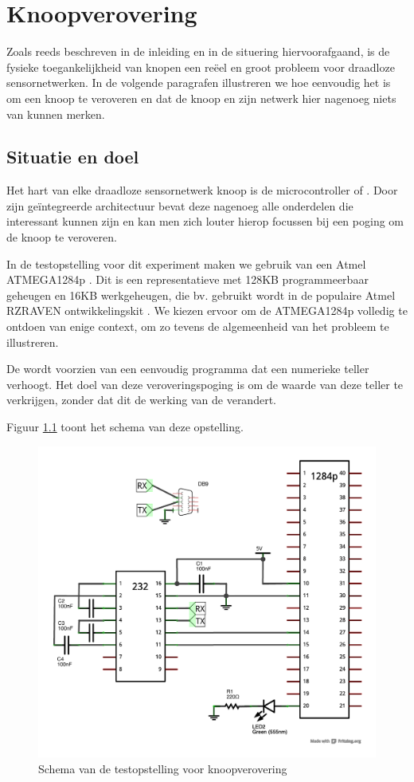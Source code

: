 
\chapter{Knoopverovering}
\label{appendix:node-capture}

Zoals reeds beschreven in de inleiding en in de situering hiervoorafgaand, is
de fysieke toegankelijkheid van knopen een re\"eel en groot probleem voor
draadloze sensornetwerken. In de volgende paragrafen illustreren we hoe
eenvoudig het is om een knoop te veroveren en dat de knoop en zijn netwerk hier
nagenoeg niets van kunnen merken.

\section{Situatie en doel}

Het hart van elke draadloze sensornetwerk knoop is de microcontroller of \mcu.
Door zijn ge\"integreerde architectuur bevat deze nagenoeg alle onderdelen die
interessant kunnen zijn en kan men zich louter hierop focussen bij een poging
om de knoop te veroveren.

In de testopstelling voor dit experiment maken we gebruik van een Atmel
ATMEGA1284p \citep{datasheet:atmega1284p}. Dit is een representatieve \mcu met
128KB programmeerbaar geheugen en 16KB werkgeheugen, die bv. gebruikt wordt in
de populaire Atmel RZRAVEN ontwikkelingskit \citep{manual:rzraven}. We kiezen
ervoor om de ATMEGA1284p volledig te ontdoen van enige context, om zo tevens de
algemeenheid van het probleem te illustreren.

De \mcu wordt voorzien van een eenvoudig programma dat een numerieke teller
verhoogt. Het doel van deze veroveringspoging is om de waarde van deze teller
te verkrijgen, zonder dat dit de werking van de \mcu verandert.

Figuur \ref{fig:node-capture-schematic} toont het schema van deze opstelling.

\begin{figure}[ht]
  \centering
  \includegraphics[width=0.7\linewidth]{resources/node-capture-schematic.pdf}
  \caption{Schema van de testopstelling voor knoopverovering}
  \label{fig:node-capture-schematic}
\end{figure}

